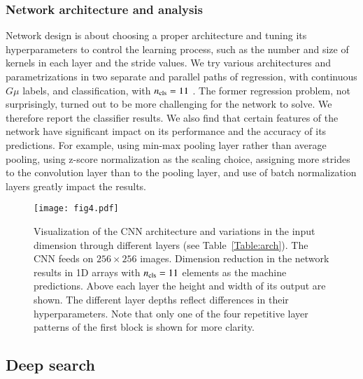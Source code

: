 \documentclass[fleqn,usenatbib]{mnras}
\begin{document}
\subsubsection{Network architecture and analysis}
Network design is about choosing a proper architecture and tuning its hyperparameters to control the learning process, such as the number and size of kernels in each layer and the stride values.  
%
We try various architectures and parametrizations in two separate and parallel paths of regression, with continuous  $G\mu$ labels, and classification,  with $n_{\rm cls}=11$ . 
%
The former regression problem, not surprisingly, turned out to be more challenging for the network to solve. We therefore report the classifier results.
%
We also find that certain features of the network have significant impact on its performance and the accuracy of its predictions. 
For example, using min-max pooling layer rather than average pooling, using 
z-score normalization as the scaling choice, assigning more strides to the convolution layer than to the pooling layer, and use of batch normalization layers greatly impact the results.

\begin{figure*}
\centering
	\texttt{[image: fig4.pdf]}
	\caption{Visualization of the CNN architecture and variations in the input dimension through different layers (see Table~\ref{Table:arch}).  The CNN feeds on $256\times256$ images. Dimension reduction in the network results in 1D arrays with $n_{\rm cls}=11$ elements as the machine predictions. Above each layer the height and width of its output are shown. The different layer depths reflect differences in their hyperparameters. Note that only one of the four repetitive layer patterns of the first block is shown for more clarity.	}
	\label{fig:arch}
\end{figure*} 



\subsection{Deep search}
\label{Deep_sec}
\end{document}
